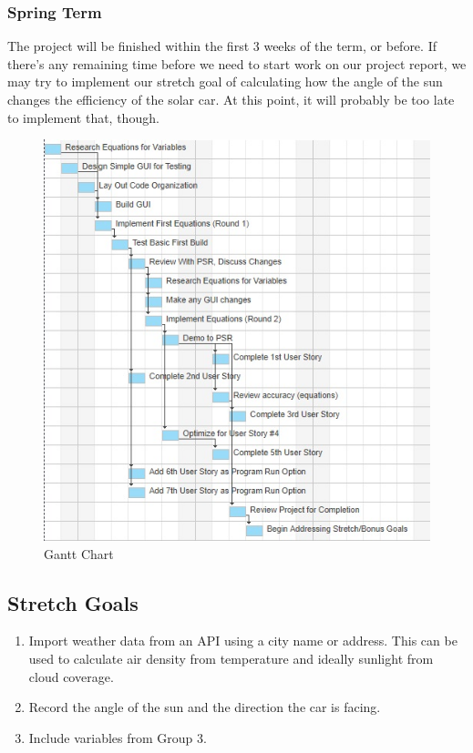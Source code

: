 \documentclass[onecolumn, draftclsnofoot,10pt, compsoc]{IEEEtran}
\begin{document}
\begin{singlespace}
        \subsubsection{Spring Term}
        The project will be finished within the first 3 weeks of the term, or before. If there's any remaining time before we need to start work on our project report, we may try to implement our stretch goal of calculating how the angle of the sun changes the efficiency of the solar car. At this point, it will probably be too late to implement that, though.
        
        \begin{figure}[!hb]
            \includegraphics{461Chartcut.jpg}
            \caption{Gantt Chart}
            \label{fig:Gantt}
        \end{figure}
        
    \subsection{Stretch Goals}
    \begin{enumerate}
        \item Import weather data from an API using a city name or address. This can be used to calculate air density from temperature and ideally sunlight from cloud coverage.
        \item Record the angle of the sun and the direction the car is facing.
        \item Include variables from Group 3.
    \end{enumerate}
    

\end{singlespace}
\end{document}
